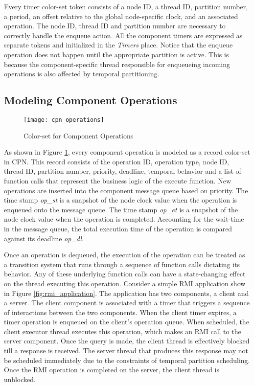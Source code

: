 Every timer color-set token consists of a node ID, a thread ID, partition number, a period, an offset relative to the global node-specific clock, and an associated operation. The node ID, thread ID and partition number are necessary to correctly handle the enqueue action. All the component timers are expressed as separate tokens and initialized in the \emph{Timers} place. Notice that the enqueue operation does not happen until the appropriate partition is active. This is because the component-specific thread responsible for enqueueing incoming operations is also affected by temporal partitioning. 

\subsection{Modeling Component Operations}
\label{sec:Modeling_Component_Operations}

\vspace{-0.1in}
\begin{figure}[ht]
\centering
\texttt{[image: cpn\_operations]}
\caption{Color-set for Component Operations}
\label{fig:cpn_operations}
\vspace{-0.2in}
\end{figure}
\vspace{0.1in}

As shown in Figure \ref{fig:cpn_operations}, every component operation is modeled as a record color-set in CPN. This record consists of the operation ID, operation type, node ID, thread ID, partition number, priority, deadline, temporal behavior and a list of function calls that represent the business logic of the execute function. New operations are inserted into the component message queue based on priority. The time stamp \emph{op\_st} is a snapshot of the node clock value when the operation is enqueued onto the message queue. The time stamp \emph{op\_et} is a snapshot of the node clock value when the operation is completed. Accounting for the wait-time in the message queue, the total execution time of the operation is compared against its deadline \emph{op\_dl}.

Once an operation is dequeued, the execution of the operation can be treated as a transition system that runs through a sequence of function calls dictating its behavior. Any of these underlying function calls can have a state-changing effect on the thread executing this operation. Consider a simple RMI application show in Figure \ref{fig:rmi_application}. The application has two components, a client and a server. The client component is associated with a timer that triggers a sequence of interactions between the two components. When the client timer expires, a timer operation is enqueued on the client's operation queue. When scheduled, the client executor thread executes this operation, which makes an RMI call to the server component. Once the query is made, the client thread is effectively blocked till a response is received. The server thread that produces this response may not be scheduled immediately due to the constraints of temporal partition scheduling. Once the RMI operation is completed on the server, the client thread is unblocked. 

